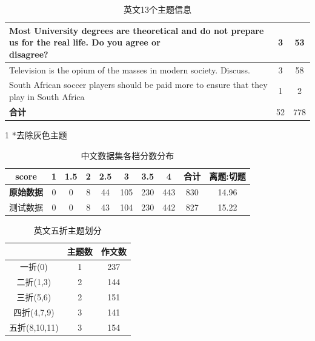 \documentclass[11pt]{article}
\begin{document}
\begin{CJK}{UTF8}{gkai}
\begin{table}[htbp]
{\begin{tabular}{lcc}
      \hline
       \makecell[l]{Most University degrees are theoretical and do not prepare us for the real life. Do you agree or \\ disagree?} & 3     & 53 \\
      \hline
       Television is the opium of the masses in modern society. Discuss. & 3     & 58 \\
      \hline
      \textcolor[rgb]{ .502,  .502,  .502}{South African soccer players should be paid more to ensure that they play in South Africa} & \textcolor[rgb]{ .502,  .502,  .502}{1} & \textcolor[rgb]{ .502,  .502,  .502}{2} \\
      \hline
      \textbf{合计} & 52 & 778\\
      \hline
    \end{tabular}}%
    \begin{tablenotes}
      \item [1] *去除灰色主题
    \end{tablenotes}
    \caption{英文13个主题信息}
  \label{tab:addlabel}%
\end{table}%

\begin{table}[htbp]
  \centering
  \begin{tabular}{c|ccccccccc}
    \hline
    \textbf{score} & \textbf{1} & \textbf{1.5} & \textbf{2} & \textbf{2.5} & \textbf{3} & \textbf{3.5} & \textbf{4} & \textbf{合计}    & \textbf{离题:切题} \\
    \hline
    \textbf{原始数据} & 0     & 0     & 8     & 44    & 105   & 230   & 443   & 830   & 14.96 \\
    \hline
    测试数据  & 0     & 0     & 8     & 43    & 104   & 230   & 442   & 827   & 15.22 \\
    \hline
  \end{tabular}%
  \caption{中文数据集各档分数分布}
  \label{tab:addlabel}%
\end{table}%

\begin{table}[htbp]
  \centering
  \begin{tabular}{c|cc}
    \hline
    & 主题数   & 作文数 \\
    \hline
    一折(0) & 1     & 237 \\
    \hline
    二折(1,3) & 2     & 144 \\
    \hline
    三折(5,6) & 2     & 151 \\
    \hline
    四折(4,7,9) & 3     & 141 \\
    \hline
    五折(8,10,11) & 3     & 154 \\
    \hline
  \end{tabular}%
  \caption{英文五折主题划分}
  \label{tab:addlabel}%
\end{table}%


\end{CJK}
\end{document}
